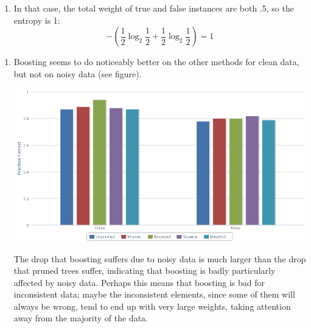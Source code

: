 \documentclass{article}
\begin{document}
\begin{enumerate}
\begin{enumerate}
\begin{enumerate}
    \item In that case, the total weight of true and false instances
      are both .5, so the entropy is 1:
      \[-\left(\frac12\log_2\frac12+\frac12\log_2\frac12\right)=1\]

    \end{enumerate}
    \begin{enumerate}
    \item Boosting seems to do noticeably better on the other methods
      for clean data, but not on noisy data (see figure).

      \begin{center}
        \includegraphics[scale=.4]{graph.png}
      \end{center}

      The drop that boosting suffers due to noisy data is much larger
      than the drop that pruned trees suffer, indicating that boosting
      is badly particularly affected by noisy data. Perhaps this means
      that boosting is bad for inconsistent data; maybe the
      inconsistent elements, since some of them will always be wrong,
      tend to end up with very large weights, taking attention away
      from the majority of the data.


\end{enumerate}
\end{enumerate}
\end{enumerate}
\end{document}
